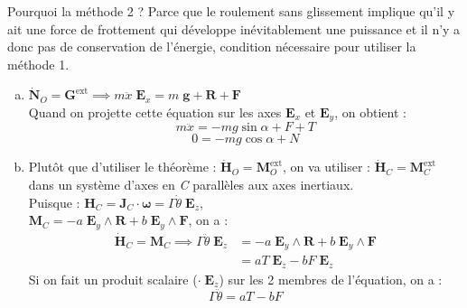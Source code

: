 \documentclass[a4paper]{article}
\begin{document}
Pourquoi la méthode 2 ? Parce que le roulement sans glissement implique qu'il y ait une force de frottement qui développe inévitablement une puissance et il n'y a donc pas de conservation de l'énergie, condition nécessaire pour utiliser la méthode 1.





\begin{siderules}
\begin{enumerate}[(a)]

\item $\displaystyle \dot{\textbf{N}}_O = \textbf{G}^{\text{ext}} \implies m \ddot{x} \; \textbf{E}_x = m \; \textbf{g} + \textbf{R} + \textbf{F} $ \\
Quand on projette cette équation sur les axes $ \textbf{E}_x $ et $ \textbf{E}_y $, on obtient : 
    \begin{equation} %
        m \ddot{x} = - m g \sin \alpha + F + T
    \end{equation}
    \begin{equation} %
        0 = - m g \cos \alpha + N
    \end{equation}

\item Plutôt que d'utiliser le théorème : $ \dot{\textbf{H}}_O = \textbf{M}_O^{\text{ext}} $, on va utiliser : $ \dot{\textbf{H}}_C = \textbf{M}_C^{\text{ext}} $ dans un système d'axes en \emph{C} parallèles aux axes inertiaux. \\
Puisque : $ \textbf{H}_C = \textbf{J}_C \cdot \boldsymbol{\omega} = \Gamma \dot{\theta} \; \textbf{E}_z $, \\
$ \textbf{M}_C = - a \; \textbf{E}_y \wedge \textbf{R} + b \; \textbf{E}_y \wedge \textbf{F} $, on a : 
\[ 
\begin{aligned}
\dot{\textbf{H}}_C = \textbf{M}_C \implies \Gamma \ddot{\theta} \; \textbf{E}_z &= - a \; \textbf{E}_y \wedge \textbf{R} + b \; \textbf{E}_y \wedge \textbf{F} \\
&= a T \; \textbf{E}_z - b F \; \textbf{E}_z
\end{aligned}
\]
Si on fait un produit scalaire ($ \cdot \; \textbf{E}_z $) sur les 2 membres de l'équation, on a : 
    \begin{equation}
        \Gamma \ddot{\theta} = a T - b F
    \end{equation}
\end{enumerate}
\end{siderules}
\end{document}
